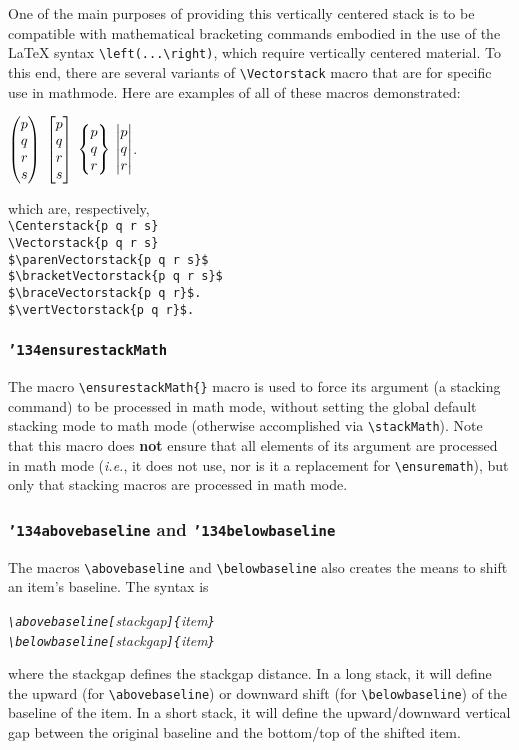 \documentclass{article}
\let\vb\verb
\newcommand\cmd[1]{\texttt{\char'134#1}}
\begin{document}
One of the main purposes of providing this vertically centered stack is
to be compatible with mathematical bracketing commands embodied in 
the use of the \LaTeX{} syntax \vb|\left(...\right)|, which require 
vertically centered material.  To this end, there
are several variants of \vb|\Vectorstack| macro that are for specific
use in mathmode.  Here are examples of all of these macros demonstrated:

{\centering
{}
$\parenVectorstack{p q r s}$
$\bracketVectorstack{p q r s}$
$\braceVectorstack{p q r}$
$\vertVectorstack{p q r}$.\par}
which are, respectively,\\
\vb|\Centerstack{p q r s}|\\
\vb|\Vectorstack{p q r s}|\\
\vb|$\parenVectorstack{p q r s}$|\\
\vb|$\bracketVectorstack{p q r s}$|\\
\vb|$\braceVectorstack{p q r}$.|\\
\vb|$\vertVectorstack{p q r}$.|


\subsubsection{\cmd{ensurestackMath}\label{s:esm}}

The macro \vb|\ensurestackMath{}| macro is used to force its argument
(a stacking command) to be processed in math mode, without setting 
the global default stacking 
mode to math mode (otherwise accomplished via \vb|\stackMath|). Note 
that this macro does \textbf{not} ensure that
all elements of its argument are processed in math mode (\textit{i.e.}, 
it does not use, nor is it a replacement for \vb|\ensuremath|), but 
only that stacking macros are processed in math mode.

\subsubsection{\cmd{abovebaseline} and \cmd{belowbaseline}\label{s:abb}}

The macros \vb|\abovebaseline| and \vb|\belowbaseline| also creates the
means to shift an item's baseline.  The syntax is

\itshape
\vb|\abovebaseline[|stackgap\vb|]{|item\vb|}|\\
\vb|\belowbaseline[|stackgap\vb|]{|item\vb|}|
\upshape

where the stackgap defines the stackgap distance.  In a long stack, it
will define the upward (for \vb|\abovebaseline|) or downward shift
(for \vb|\belowbaseline|) of the baseline of the item.  In a short
stack, it will define the upward/downward vertical gap between the
original baseline and the bottom/top of the shifted item.
\end{document}
